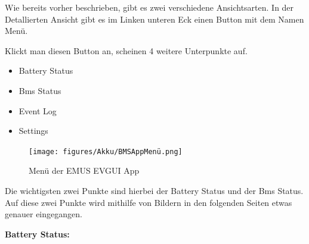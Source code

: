 Wie bereits vorher beschrieben, gibt es zwei verschiedene Ansichtsarten. In der Detallierten Ansicht gibt es im Linken unteren Eck einen Button mit dem Namen Menü.

Klickt man diesen Button an, scheinen 4 weitere Unterpunkte auf. 

\begin{itemize}
\item{Battery Status}\\
\item{Bms Status}\\
\item{Event Log}\\
\item{Settings}\\
\end{itemize}

\begin{figure}[H]
	\begin{center}
		\texttt{[image: figures/Akku/BMSAppMenü.png]}
		\caption{Menü der EMUS EVGUI App}
	\end{center}
\end{figure}

Die wichtigsten zwei Punkte sind hierbei der Battery Status und der Bms Status. Auf diese zwei Punkte wird mithilfe von Bildern in den folgenden Seiten etwas genauer eingegangen.

\textbf{Battery Status:}

